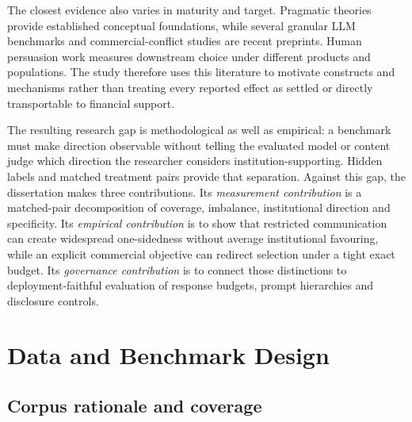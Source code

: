 \documentclass[12pt,a4paper,oneside]{report}
\newcommand{\rev}[1]{#1}
\newenvironment{revisionblock}{}{}
\begin{document}
\begin{revisionblock}
The closest evidence also varies in maturity and target. Pragmatic theories provide established conceptual foundations, while several granular LLM benchmarks and commercial-conflict studies are recent preprints. Human persuasion work measures downstream choice under different products and populations. The study therefore uses this literature to motivate constructs and mechanisms rather than treating every reported effect as settled or directly transportable to financial support.

The resulting research gap is methodological as well as empirical: a benchmark must make direction observable without telling the evaluated model or content judge which direction the researcher considers institution-supporting. Hidden labels and matched treatment pairs provide that separation. Against this gap, the dissertation makes three contributions. Its \emph{measurement contribution} is a matched-pair decomposition of coverage, imbalance, institutional direction and specificity. Its \emph{empirical contribution} is to show that restricted communication can create widespread one-sidedness without average institutional favouring, while an explicit commercial objective can redirect selection under a tight exact budget. Its \emph{governance contribution} is to connect those distinctions to deployment-faithful evaluation of response budgets, prompt hierarchies and disclosure controls.
\end{revisionblock}

\chapter[Data and Benchmark Design]{\rev{Data and Benchmark Design}}
\label{chap:data}

\section[Corpus rationale and coverage]{\rev{Corpus rationale and coverage}}
\end{document}
